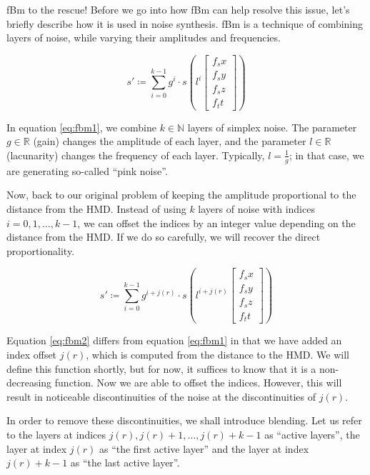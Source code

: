 \Ac{fBm} to the rescue! Before we go into how \ac{fBm} can help resolve this issue, let's briefly describe how it is used in noise synthesis. \ac{fBm} is a technique of combining layers of noise, while varying their amplitudes and frequencies.

\begin{equation}\label{eq:fbm1}
    s' \coloneqq \sum_{i=0}^{k-1} g^i \cdot s\left(l^{i} \begin{bmatrix}f_sx\\f_sy\\f_sz\\f_tt\end{bmatrix}\right)
\end{equation}

In equation \ref{eq:fbm1}, we combine $k \in \mathbb{N}$ layers of simplex noise. The parameter $g \in \mathbb{R}$ (gain) changes the amplitude of each layer, and the parameter $l \in \mathbb{R}$ (lacunarity) changes the frequency of each layer. Typically, $l = \frac{1}{g}$; in that case, we are generating so-called ``pink noise''.

Now, back to our original problem of keeping the amplitude proportional to the distance from the \ac{HMD}. Instead of using $k$ layers of noise with indices $i = 0, 1, \dots, k - 1$, we can offset the indices by an integer value depending on the distance from the \ac{HMD}. If we do so carefully, we will recover the direct proportionality.

\begin{equation}\label{eq:fbm2}
    s' \coloneqq \sum_{i=0}^{k-1} g^{i+j(r)} \cdot s\left(l^{i+j(r)} \begin{bmatrix}f_sx\\f_sy\\f_sz\\f_tt\end{bmatrix}\right)
\end{equation}

Equation \ref{eq:fbm2} differs from equation \ref{eq:fbm1} in that we have added an index offset $j(r)$, which is computed from the distance to the \ac{HMD}. We will define this function shortly, but for now, it suffices to know that it is a non-decreasing function. Now we are able to offset the indices. However, this will result in noticeable discontinuities of the noise at the discontinuities of $j(r)$.

In order to remove these discontinuities, we shall introduce blending. Let us refer to the layers at indices $j(r), j(r) + 1, \dots, j(r) + k - 1$ as ``active layers'', the layer at index $j(r)$ as ``the first active layer'' and the layer at index $j(r) + k - 1$ as ``the last active layer''.

